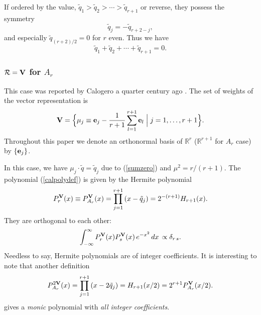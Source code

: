 \documentclass[a4paper,12pt]{article}
\begin{document}
If ordered by the value, $\tilde{q}_1>\tilde{q}_2>\cdots>\tilde{q}_{r+1}$
or reverse, they possess the symmetry
\begin{equation}
   \tilde{q}_j=-\tilde{q}_{r+2-j},
   \label{qj-qr+2-j}
\end{equation}
and especially $\tilde{q}_{(r+2)/2}=0$ for $r$ even. Thus we have
\begin{equation}
   \tilde{q}_1+\tilde{q}_2+\cdots+\tilde{q}_{r+1}=0.
   \label{sumzero}
\end{equation}

\subsubsection{${\cal R}={\bf V}$ for $A_r$}

This case was reported by Calogero a quarter century ago \cite{calmat}.
The set of weights of the vector representation is
\begin{equation}
   {\bf V}=\Bigl\{\mu_j\equiv{\bf e}_j-\frac{1}{r+1}\sum_{l=1}^{r+1}{\bf e}_l
   \Bigm|j=1,\ldots,r+1\Bigr\}.
   \label{ArV}
\end{equation}
Throughout this paper we denote an orthonormal basis of ${\mathbb R}^r$
(${\mathbb R}^{r+1}$ for
$A_r$ case) by $\{{\bf e}_j\}$.

In this case, we have $\mu_j\cdot\tilde{q}=\tilde{q}_j$ due to (\ref{sumzero})
and $\mu^2=r/(r+1)$.
The polynomial (\ref{calpolydef}) is given by the Hermite polynomial
\begin{equation}
   P_r^{\bf V}(x)\equiv P_{A_r}^{\bf V}(x)=
   \prod_{j=1}^{r+1}\left(x-\tilde{q}_j\right)
   =2^{-(r+1)}H_{r+1}(x).
   \label{hermpoly}
\end{equation}
They are orthogonal to each other:
\begin{equation}
   \int_{-\infty}^\infty P_r^{\bf V}(x)P_s^{\bf V}(x)\,e^{-x^2}\,dx\,
   \propto\delta_{r\,s}.
\end{equation}
Needless to say, Hermite polynomials are of integer coefficients.
It is interesting to note that another definition
\begin{equation}
   P_{A_r}^{2{\bf V}}(x)=
   \prod_{j=1}^{r+1}\left(x-2\tilde{q}_j\right)
   =H_{r+1}(x/2)=2^{r+1}P_{A_r}^{\bf V}(x/2).
   \label{hermpoly2}
\end{equation}
gives a {\em monic} polynomial with {\em all integer coefficients\/}.

\end{document}
